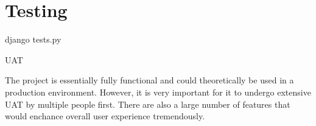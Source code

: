 \documentclass[12pt, a4paper]{report}
\begin{document}


\newpage

\thispagestyle{empty}

\newpage

\thispagestyle{empty}

\newpage
\pagestyle{empty} %
\tableofcontents
\clearpage 


\newpage
\pagestyle{plain} %






\newpage


\section{Testing}

django tests.py

UAT

\newpage



The project is essentially fully functional and could theoretically be used in a production environment. However, it is very important for it to undergo extensive UAT by multiple people first. There are also a large number of features that would enchance overall user experience tremendously. 

\newpage
\nocite{*}
\printbibliography[heading=bibintoc, title={References}]

\newpage

\end{document}
